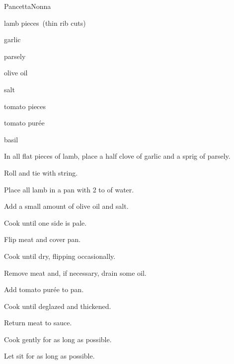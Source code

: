 \begin{recipe}{Pancetta}{Nonna}{}

\begin{ingredients}
\item lamb pieces~(thin rib cuts)
\item garlic
\item parsely
\item olive oil
\item salt
\item tomato pieces
\item tomato pur\'ee
\item basil
\end{ingredients}

\begin{directions}
\item In all flat pieces of lamb, place a half clove of garlic and a sprig of parsely.
\item Roll and tie with string.
\item Place all lamb in a pan with 2 to  of water.
\item Add a small amount of olive oil and salt.
\item Cook until one side is pale.
\item Flip meat and cover pan.
\item Cook until dry, flipping occasionally.
\item Remove meat and, if necessary, drain some oil.
\item Add tomato pur\'ee to pan.
\item Cook until deglazed and thickened.
\item Return meat to sauce.
\item Cook gently for as long as possible.
\item Let sit for as long as possible.
\end{directions}

\end{recipe}
